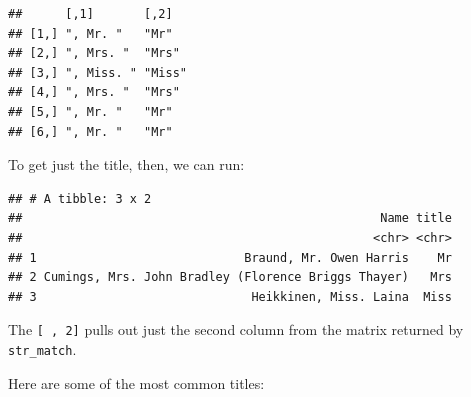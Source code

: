 \documentclass[]{book}
\makeatletter
\newenvironment{Shaded}{\begin{snugshade}}{\end{snugshade}}
\newcommand{\KeywordTok}[1]{\textcolor[rgb]{0.13,0.29,0.53}{\textbf{#1}}}
\newcommand{\DataTypeTok}[1]{\textcolor[rgb]{0.13,0.29,0.53}{#1}}
\newcommand{\DecValTok}[1]{\textcolor[rgb]{0.00,0.00,0.81}{#1}}
\newcommand{\CharTok}[1]{\textcolor[rgb]{0.31,0.60,0.02}{#1}}
\newcommand{\StringTok}[1]{\textcolor[rgb]{0.31,0.60,0.02}{#1}}
\newcommand{\OperatorTok}[1]{\textcolor[rgb]{0.81,0.36,0.00}{\textbf{#1}}}
\newcommand{\NormalTok}[1]{#1}
\newenvironment{kframe}{%
\medskip{}
\setlength{\fboxsep}{.8em}
 \def\at@end@of@kframe{}%
 \ifinner\ifhmode%
  \def\at@end@of@kframe{\end{minipage}}%
  \begin{minipage}{\columnwidth}%
 \fi\fi%
 \def\FrameCommand##1{\hskip\@totalleftmargin \hskip-\fboxsep
 \colorbox{shadecolor}{##1}\hskip-\fboxsep
     \hskip-\linewidth \hskip-\@totalleftmargin \hskip\columnwidth}%
 \MakeFramed {\advance\hsize-\width
   \@totalleftmargin\z@ \linewidth\hsize
   \@setminipage}}%
 {\par\unskip\endMakeFramed%
 \at@end@of@kframe}
\renewenvironment{Shaded}{\begin{kframe}}{\end{kframe}}
\theoremstyle{definition}
\theoremstyle{definition}
\theoremstyle{definition}
\theoremstyle{remark}
\makeatother
\begin{document}
\begin{Shaded}
\end{Shaded}

\begin{verbatim}
##      [,1]       [,2]  
## [1,] ", Mr. "   "Mr"  
## [2,] ", Mrs. "  "Mrs" 
## [3,] ", Miss. " "Miss"
## [4,] ", Mrs. "  "Mrs" 
## [5,] ", Mr. "   "Mr"  
## [6,] ", Mr. "   "Mr"
\end{verbatim}

To get just the title, then, we can run:

\begin{Shaded}
\end{Shaded}

\begin{verbatim}
## # A tibble: 3 x 2
##                                                  Name title
##                                                 <chr> <chr>
## 1                             Braund, Mr. Owen Harris    Mr
## 2 Cumings, Mrs. John Bradley (Florence Briggs Thayer)   Mrs
## 3                              Heikkinen, Miss. Laina  Miss
\end{verbatim}

The \texttt{{[}\ ,\ 2{]}} pulls out just the second column from the
matrix returned by \texttt{str\_match}.

Here are some of the most common titles:
\end{document}

